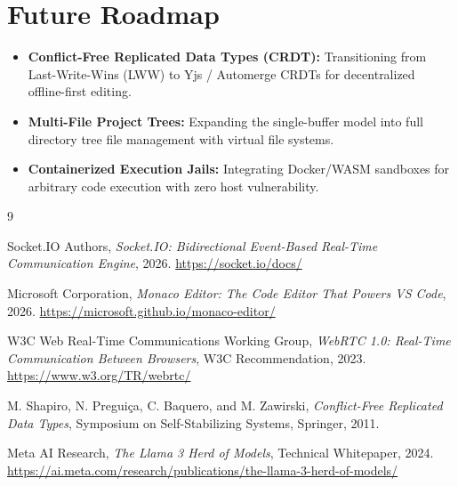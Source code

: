 \documentclass[12pt,a4paper]{report}
\begin{document}
\section{Future Roadmap}
\begin{itemize}
    \item \textbf{Conflict-Free Replicated Data Types (CRDT):} Transitioning from Last-Write-Wins (LWW) to Yjs / Automerge CRDTs for decentralized offline-first editing.
    \item \textbf{Multi-File Project Trees:} Expanding the single-buffer model into full directory tree file management with virtual file systems.
    \item \textbf{Containerized Execution Jails:} Integrating Docker/WASM sandboxes for arbitrary code execution with zero host vulnerability.
\end{itemize}

\cleardoublepage
\begin{thebibliography}{9}

Socket.IO Authors, \textit{Socket.IO: Bidirectional Event-Based Real-Time Communication Engine}, 2026. \url{https://socket.io/docs/}

Microsoft Corporation, \textit{Monaco Editor: The Code Editor That Powers VS Code}, 2026. \url{https://microsoft.github.io/monaco-editor/}

W3C Web Real-Time Communications Working Group, \textit{WebRTC 1.0: Real-Time Communication Between Browsers}, W3C Recommendation, 2023. \url{https://www.w3.org/TR/webrtc/}

M. Shapiro, N. Pregui\c{c}a, C. Baquero, and M. Zawirski, \textit{Conflict-Free Replicated Data Types}, Symposium on Self-Stabilizing Systems, Springer, 2011.

Meta AI Research, \textit{The Llama 3 Herd of Models}, Technical Whitepaper, 2024. \url{https://ai.meta.com/research/publications/the-llama-3-herd-of-models/}

\end{thebibliography}
\end{document}
